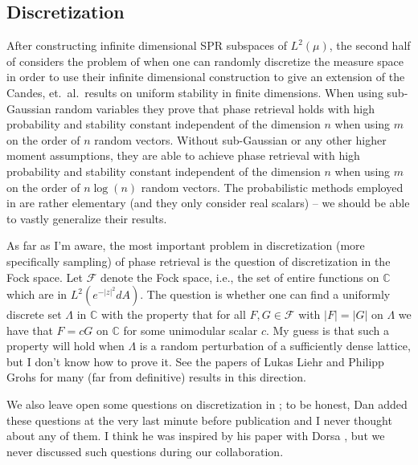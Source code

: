 \documentclass[12pt,leqno]{amsart}
\numberwithin{equation}{section}
\theoremstyle{plain}
\theoremstyle{definition}
\begin{document}
\subsection{Discretization}
After constructing infinite dimensional SPR subspaces of $L^2(\mu)$, the second half of \cite{calderbank2022stable}  considers the problem of when one can randomly discretize the measure space in order to use  their infinite dimensional construction to give an extension of the Candes, et.~al.~results on uniform stability in finite dimensions. When using sub-Gaussian random variables they prove that phase retrieval holds with high probability and stability constant independent of the dimension $n$ when using $m$ on the order of $n$ random vectors. Without sub-Gaussian or any other higher moment assumptions, they are able to achieve phase retrieval with high probability and stability constant independent of the dimension $n$ when using $m$ on the order of $n \log(n)$ random vectors.
The probabilistic methods  employed in \cite{calderbank2022stable} are rather elementary (and they only consider real scalars) -- we should be able to vastly generalize their results.
\medskip



As far as I'm aware, the most important problem in discretization (more specifically sampling) of phase retrieval is the question of discretization in the Fock space. Let $\mathcal{F}$ denote the Fock space, i.e., the set of entire functions on $\mathbb{C}$ which are in $L^2(e^{-|z|^2}dA)$. The question is whether one can find a uniformly discrete set $\Lambda$ in $\mathbb{C}$ with the property that for all $F,G\in \mathcal{F}$ with $|F|=|G|$ on $\Lambda$ we have that $F=c G$ on $\mathbb{C}$ for some unimodular scalar $c$.
My guess is that such a property will hold when $\Lambda$ is a random perturbation of a sufficiently dense lattice, but I don't know how to prove it. See the papers of Lukas Liehr and Philipp Grohs for many (far from definitive) results in this direction.
\medskip


We also leave open some questions on discretization in \cite{Stablephaseretrieval}; to be honest, Dan added these questions at the very last minute before publication and I never thought about any of them. I think he was inspired by his paper with  Dorsa \cite{fg22}, but we never discussed such questions during our collaboration.
\end{document}
